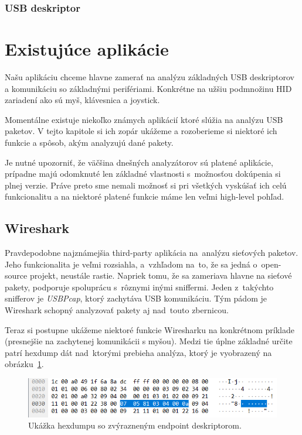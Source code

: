 \subsubsection{USB deskriptor}

\section{Existujúce aplikácie}

Našu aplikáciu chceme hlavne zamerať na analýzu základných USB deskriptorov a komunikáciu so základnými perifériami. Konkrétne na užšiu podmnožinu HID zariadení ako sú myš, klávesnica a joystick.

Momentálne existuje niekoľko známych aplikácií ktoré slúžia na analýzu USB paketov. V tejto kapitole si ich zopár ukážeme a rozoberieme si niektoré ich funkcie a spôsob, akým analyzujú dané pakety.

Je nutné upozorniť, že väčšina dnešných analyzátorov sú platené aplikácie, prípadne majú odomknuté len základné vlastnosti s~možnosťou dokúpenia si plnej verzie. Práve preto sme nemali možnosť si pri všetkých vyskúšať ich celú funkcionalitu a na niektoré platené funkcie máme len veľmi high-level pohľad.

\subsection*{Wireshark}

Pravdepodobne najznámejšia third-party aplikácia na~analýzu sieťových paketov. Jeho funkcionalita je veľmi rozsiahla, a~vzhľadom na~to, že sa jedná o~open-source projekt, neustále rastie. Napriek tomu, že sa zameriava hlavne na sieťové pakety, podporuje spoluprácu s~rôznymi inými sniffermi. Jeden z~takýchto snifferov je \textit{USBPcap}, ktorý zachytáva USB komunikáciu. Tým pádom je Wireshark schopný analyzovať pakety aj nad~touto zbernicou. 

Teraz si postupne ukážeme niektoré funkcie Wiresharku na konkrétnom príklade (presnejšie na zachytenej komunikácii s myšou). Medzi tie úplne základné určite patrí hexdump dát nad~ktorými prebieha analýza, ktorý je vyobrazený na obrázku~\ref{obr:uvod:wireshark_hexdump}. 

\begin{figure}[!htb]
	\centering
	\includegraphics[width=\textwidth]{img/uvod_wireshark_hexdump}
	\caption{Ukážka hexdumpu so zvýrazneným endpoint deskriptorom.}
	\label{obr:uvod:wireshark_hexdump}
\end{figure}

